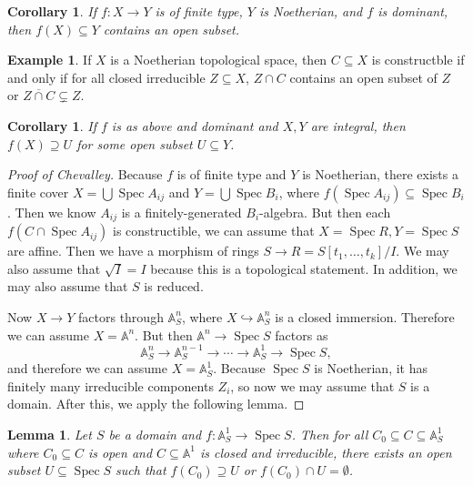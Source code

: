 \documentclass[leqno, openany]{memoir}
\newtheorem{cor}[thm]{Corollary}
\newtheorem{lem}[thm]{Lemma}
\theoremstyle{definition}
\newtheorem{exm}[thm]{Example}
\theoremstyle{remark}
\theoremstyle{plain}
\theoremstyle{definition}
\theoremstyle{remark}
\newcommand{\A}{\mathbb{A}}
\newcommand{\ol}[1]{\overline{#1}}
\DeclareMathOperator{\Spec}{Spec}
\begin{document}
\begin{cor}
    If $f \colon X \to Y$ is of finite type, $Y$ is Noetherian, and $f$ is dominant, then $f(X) \subseteq Y$ contains an open subset.
\end{cor}

\begin{exm}
    If $X$ is a Noetherian topological space, then $C \subseteq X$ is constructble if and only if for all closed irreducible $Z \subseteq X$, $Z \cap C$ contains an open subset of $Z$ or $\ol{Z \cap C} \subsetneq Z$. 
\end{exm}

\begin{cor}
    If $f$ is as above and dominant and $X,Y$ are integral, then $f(X) \supseteq U$ for some open subset $U \subseteq Y$.
\end{cor}

\begin{proof}[Proof of Chevalley]
    Because $f$ is of finite type and $Y$ is Noetherian, there exists a finite cover $X = \bigcup \Spec A_{ij}$ and $Y = \bigcup \Spec B_i$, where $f(\Spec A_{ij}) \subseteq \Spec B_i$. Then we know $A_{ij}$ is a finitely-generated $B_i$-algebra. But then each $f(C \cap \Spec A_{ij})$ is constructible, we can assume that $X = \Spec R, Y = \Spec S$ are affine. Then we have a morphism of rings $S \to R = S[t_1, \ldots, t_k] / I$. We may also assume that $\sqrt{I} = I$ because this is a topological statement. In addition, we may also assume that $S$ is reduced.

    Now $X \to Y$ factors through $\A^n_S$, where $X \hookrightarrow \A^n_S$ is a closed immersion. Therefore we can assume $X = \A^n$. But then $\A^n \to \Spec S$ factors as 
    \[ \A^n_S \to \A^{n-1}_S \to \cdots \to \A^1_S \to \Spec S, \]
    and therefore we can assume $X = \A^1_S$. Because $\Spec S$ is Noetherian, it has finitely many irreducible components $Z_i$, so now we may assume that $S$ is a domain. After this, we apply the following lemma.
\end{proof}

\begin{lem}
    Let $S$ be a domain and $f \colon \A^1_S \to \Spec S$. Then for all $C_0 \subseteq C \subseteq \A^1_S$ where $C_0 \subseteq C$ is open and $C \subseteq \A^1$ is closed and irreducible, there exists an open subset $U \subseteq \Spec S$ such that $f(C_0) \supseteq U$ or $f(C_0) \cap U = \emptyset$.
\end{lem}
\end{document}
